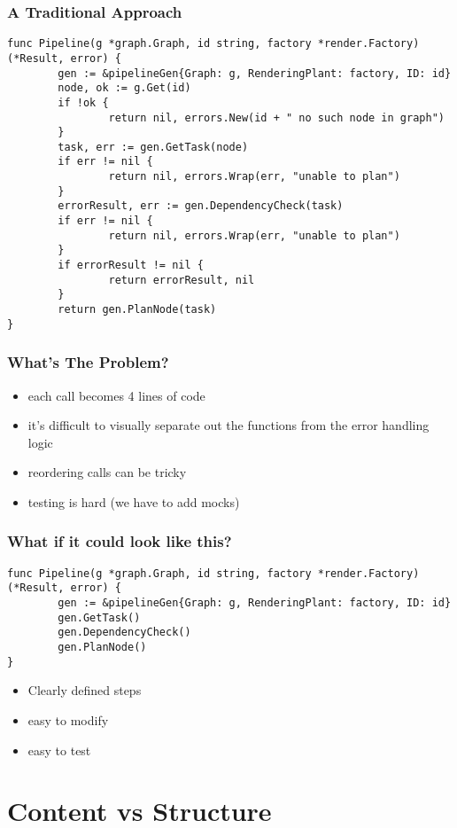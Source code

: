 \documentclass{beamer}
\begin{document}
\begin{frame}[fragile]
  \frametitle{A Traditional Approach}
\begin{lstlisting}
func Pipeline(g *graph.Graph, id string, factory *render.Factory) (*Result, error) {
        gen := &pipelineGen{Graph: g, RenderingPlant: factory, ID: id}
        node, ok := g.Get(id)
        if !ok {
                return nil, errors.New(id + " no such node in graph")
        }
        task, err := gen.GetTask(node)
        if err != nil {
                return nil, errors.Wrap(err, "unable to plan")
        }
        errorResult, err := gen.DependencyCheck(task)
        if err != nil {
                return nil, errors.Wrap(err, "unable to plan")
        }
        if errorResult != nil {
                return errorResult, nil
        }
        return gen.PlanNode(task)
}
\end{lstlisting}
\end{frame}

\begin{frame}
  \frametitle{What's The Problem?}
  \begin{itemize}
  \item each call becomes 4 lines of code
  \item it's difficult to visually separate out the functions from the error handling logic
  \item reordering calls can be tricky
  \item testing is hard (we have to add mocks)
  \end{itemize}
\end{frame}


\begin{frame}[fragile]
  \frametitle{What if it could look like this?}
\begin{lstlisting}
func Pipeline(g *graph.Graph, id string, factory *render.Factory) (*Result, error) {
        gen := &pipelineGen{Graph: g, RenderingPlant: factory, ID: id}
        gen.GetTask()
        gen.DependencyCheck()
        gen.PlanNode()
}
\end{lstlisting}

  \begin{itemize}
  \item Clearly defined steps
  \item easy to modify
  \item easy to test
  \end{itemize}
\end{frame}

\section{Content vs Structure}
\end{document}
